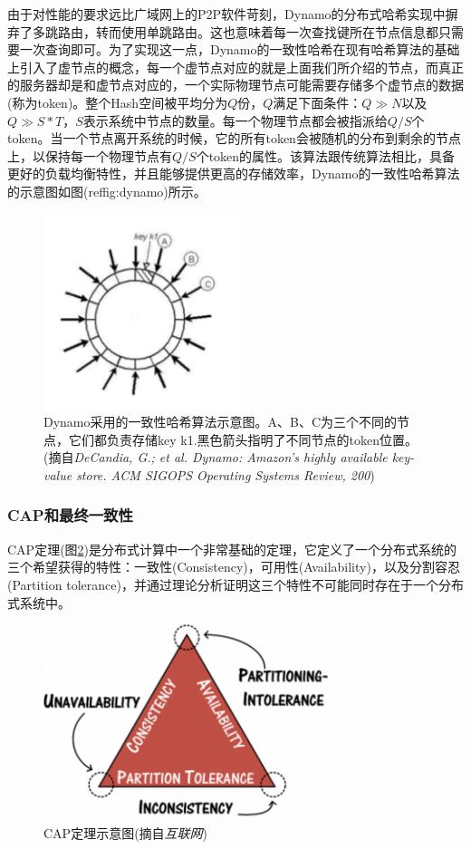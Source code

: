 由于对性能的要求远比广域网上的P2P软件苛刻，Dynamo的分布式哈希实现中摒弃了多跳路由，转而使用单跳路由。这也意味着每一次查找键所在节点信息都只需要一次查询即可。为了实现这一点，Dynamo的一致性哈希在现有哈希算法的基础上引入了虚节点的概念，每一个虚节点对应的就是上面我们所介绍的节点，而真正的服务器却是和虚节点对应的，一个实际物理节点可能需要存储多个虚节点的数据(称为token)。整个Hash空间被平均分为$Q$份，$Q$满足下面条件：$Q\gg N$以及$Q \gg S*T$，$S$表示系统中节点的数量。每一个物理节点都会被指派给$Q/S$个token。当一个节点离开系统的时候，它的所有token会被随机的分布到剩余的节点上，以保持每一个物理节点有$Q/S$个token的属性。该算法跟传统算法相比，具备更好的负载均衡特性，并且能够提供更高的存储效率，Dynamo的一致性哈希算法的示意图如图(ref{fig:dynamo})所示。

\begin{figure}[]
\centering
\includegraphics[height=2.25in]{../figures/dhtdynamo.pdf}
\caption{Dynamo采用的一致性哈希算法示意图。A、B、C为三个不同的节点，它们都负责存储key k1.黑色箭头指明了不同节点的token位置。(摘自\textit{DeCandia, G.; et al. Dynamo: Amazon's highly available key-value store. ACM SIGOPS Operating Systems Review, 200})}
\label{fig:dynamo}
\end{figure}

\subsubsection{CAP和最终一致性}

CAP定理(图\ref{fig:cap})是分布式计算中一个非常基础的定理，它定义了一个分布式系统的三个希望获得的特性：一致性(Consistency)，可用性(Availability)，以及分割容忍(Partition tolerance)，并通过理论分析证明这三个特性不可能同时存在于一个分布式系统中。

\begin{figure}[]
\centering
\includegraphics[height=2.25in]{../figures/cap.pdf}
\caption{CAP定理示意图(摘自\textit{互联网})}
\label{fig:cap}
\end{figure}

